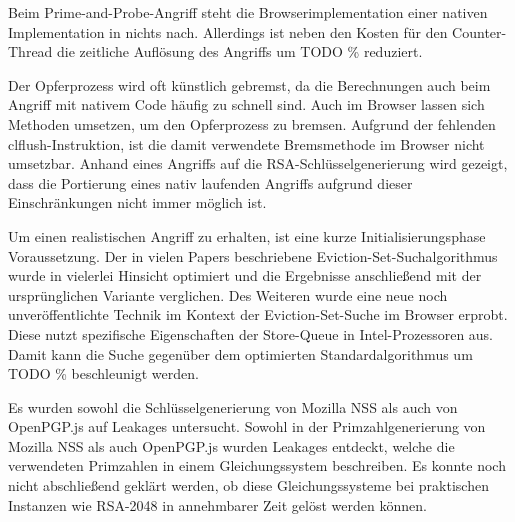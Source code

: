 Beim Prime-and-Probe-Angriff steht die Browserimplementation einer nativen Implementation in nichts nach. Allerdings ist neben den Kosten für den Counter-Thread die zeitliche Auflösung des Angriffs um  TODO \% reduziert.

Der Opferprozess wird oft künstlich gebremst, da die Berechnungen auch beim Angriff mit nativem Code häufig zu schnell sind.
Auch im Browser lassen sich Methoden umsetzen, um den Opferprozess zu bremsen. %
Aufgrund der fehlenden clflush-Instruktion, ist die damit verwendete Bremsmethode im Browser nicht umsetzbar.
Anhand eines Angriffs auf die RSA-Schlüsselgenerierung wird gezeigt, dass die Portierung eines nativ laufenden Angriffs aufgrund dieser Einschränkungen nicht immer möglich ist.

\par \medskip  

Um einen realistischen Angriff zu erhalten, ist eine kurze Initialisierungsphase Voraussetzung.
Der in vielen Papers beschriebene Eviction-Set-Suchalgorithmus \cite{PrimeAndAbort, LiuPrimeAndProbe, DriveByPaper} wurde in vielerlei Hinsicht optimiert und die Ergebnisse anschließend mit der ursprünglichen Variante verglichen. 
Des Weiteren wurde eine neue noch unveröffentlichte Technik im Kontext der Eviction-Set-Suche im Browser erprobt.
Diese nutzt spezifische Eigenschaften der Store-Queue in Intel-Prozessoren aus.
Damit kann die Suche gegenüber dem optimierten Standardalgorithmus um  TODO \% beschleunigt werden.


\par \medskip  

Es wurden sowohl die Schlüsselgenerierung von Mozilla NSS als auch von OpenPGP.js auf Leakages untersucht. 
Sowohl in der Primzahlgenerierung von Mozilla NSS als auch OpenPGP.js wurden Leakages entdeckt, welche die verwendeten Primzahlen in einem Gleichungssystem beschreiben.
Es konnte noch nicht abschließend geklärt werden, ob diese Gleichungssysteme bei praktischen Instanzen wie RSA-2048 in annehmbarer Zeit gelöst werden können.

